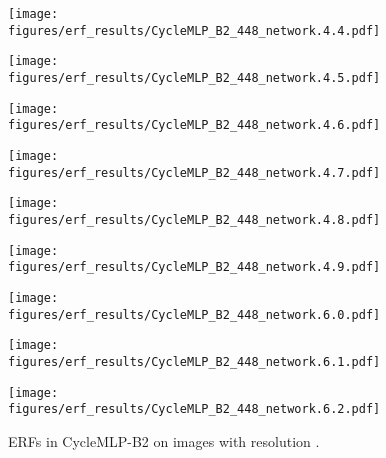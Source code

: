 \documentclass{article}
\begin{document}
\begin{figure}[tb]
\begin{minipage}[t]{0.13\hsize}
    \label{figure:erf_cyclemlp_448:8}
  \end{minipage}
  \begin{minipage}[t]{0.13\hsize}
    \centering
    \texttt{[image: figures/erf\_results/CycleMLP\_B2\_448\_network.4.4.pdf]}
    \label{figure:erf_cyclemlp_448:9}
  \end{minipage}
  \begin{minipage}[t]{0.13\hsize}
    \centering
    \texttt{[image: figures/erf\_results/CycleMLP\_B2\_448\_network.4.5.pdf]}
    \label{figure:erf_cyclemlp_448:10}
  \end{minipage}
  \begin{minipage}[t]{0.13\hsize}
    \centering
    \texttt{[image: figures/erf\_results/CycleMLP\_B2\_448\_network.4.6.pdf]}
    \label{figure:erf_cyclemlp_448:11}
  \end{minipage}
  \begin{minipage}[t]{0.13\hsize}
    \centering
    \texttt{[image: figures/erf\_results/CycleMLP\_B2\_448\_network.4.7.pdf]}
    \label{figure:erf_cyclemlp_448:12}
  \end{minipage}
  \begin{minipage}[t]{0.13\hsize}
    \centering
    \texttt{[image: figures/erf\_results/CycleMLP\_B2\_448\_network.4.8.pdf]}
    \label{figure:erf_cyclemlp_448:13}
  \end{minipage}
  \begin{minipage}[t]{0.13\hsize}
    \centering
    \texttt{[image: figures/erf\_results/CycleMLP\_B2\_448\_network.4.9.pdf]}
    \label{figure:erf_cyclemlp_448:14}
  \end{minipage}
  \begin{minipage}[t]{0.13\hsize}
    \centering
    \texttt{[image: figures/erf\_results/CycleMLP\_B2\_448\_network.6.0.pdf]}
    \label{figure:erf_cyclemlp_448:15}
  \end{minipage}
  \begin{minipage}[t]{0.13\hsize}
    \centering
    \texttt{[image: figures/erf\_results/CycleMLP\_B2\_448\_network.6.1.pdf]}
    \label{figure:erf_cyclemlp_448:16}
  \end{minipage}
  \begin{minipage}[t]{0.13\hsize}
    \centering
    \texttt{[image: figures/erf\_results/CycleMLP\_B2\_448\_network.6.2.pdf]}
    \label{figure:erf_cyclemlp_448:17}
  \end{minipage}
  \caption{ERFs in CycleMLP-B2 \cite{chen2022cyclemlp} on images with resolution .}
    \label{figure:erf_cyclemlp_448}
\end{figure} 
\end{document}
